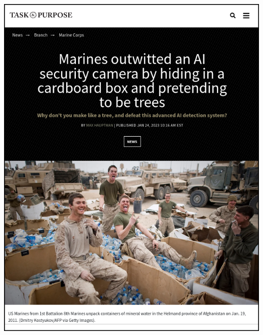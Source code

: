 \documentclass[aspectratio=169,usenames,dvipsnames]{beamer}
\begin{document}
\begin{frame}
\begin{minipage}{0.48\textwidth}
\begin{center}
\includegraphics[height=0.75\textheight, keepaspectratio]{images/marines_article}
\end{center}
\end{minipage}
\end{frame}
\end{document}
